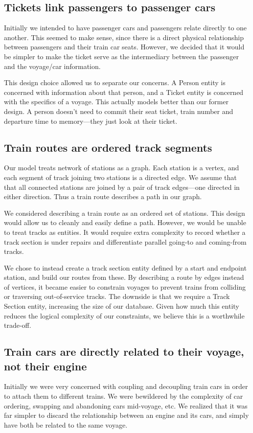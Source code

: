 \documentclass[a4paper]{article}
\begin{document}
\subsection*{Tickets link passengers to passenger cars}
Initially we intended to have passenger cars and passengers relate directly to one another. This seemed to make sense, since there is a direct physical relationship between passengers and their train car seats. However, we decided that it would be simpler to make the ticket serve as the intermediary between the passenger and the voyage/car information.

This design choice allowed us to separate our concerns. A Person entity is concerned with information about that person, and a Ticket entity is concerned with the specifics of a voyage. This actually models better than our former design. A person doesn’t need to commit their seat ticket, train number and departure time to memory—they just look at their ticket.

\subsection*{Train routes are ordered track segments}
Our model treats network of stations as a graph. Each station is a vertex, and each segment of track joining two stations is a directed edge. We assume that that all connected stations are joined by a pair of track edges—one directed in either direction. Thus a train route describes a path in our graph.

We considered describing a train route as an ordered set of stations. This design would allow us to cleanly and easily define a path. However, we would be unable to treat tracks as entities. It would require extra complexity to record whether a track section is under repairs and differentiate parallel going-to and coming-from tracks.

We chose to instead create a track section entity defined by a start and endpoint station, and build our routes from these. By describing a route by edges instead of vertices, it became easier to constrain voyages to prevent trains from colliding or traversing out-of-service tracks. The downside is that we require a Track Section entity, increasing the size of our database. Given how much this entity reduces the logical complexity of our constraints, we believe this is a worthwhile trade-off.

\subsection*{Train cars are directly related to their voyage, not their engine}
Initially we were very concerned with coupling and decoupling train cars in order to attach them to different trains. We were bewildered by the complexity of car ordering, swapping and abandoning cars mid-voyage, etc. We realized that it was far simpler to discard the relationship between an engine and its cars, and simply have both be related to the same voyage.
\end{document}
